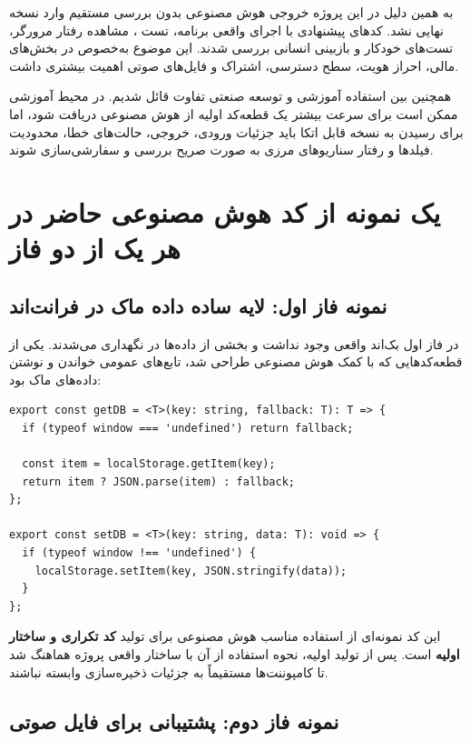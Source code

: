 \documentclass[12pt,a4paper]{article}
\newcommand{\eng}[1]{\lr{#1}}
\begin{document}
به همین دلیل در این پروژه خروجی هوش مصنوعی بدون بررسی مستقیم وارد نسخه نهایی نشد. کدهای پیشنهادی
با اجرای واقعی برنامه، تست \eng{API}، مشاهده رفتار مرورگر، تست‌های خودکار و بازبینی انسانی بررسی شدند.
این موضوع به‌خصوص در بخش‌های مالی، احراز هویت، سطح دسترسی، اشتراک و فایل‌های صوتی اهمیت بیشتری داشت.

همچنین بین استفاده آموزشی و توسعه صنعتی تفاوت قائل شدیم. در محیط آموزشی ممکن است برای سرعت بیشتر
یک قطعه‌کد اولیه از هوش مصنوعی دریافت شود، اما برای رسیدن به نسخه قابل اتکا باید جزئیات ورودی، خروجی،
حالت‌های خطا، محدودیت فیلدها و رفتار سناریوهای مرزی به صورت صریح بررسی و سفارشی‌سازی شوند.

\section{یک نمونه از کد هوش مصنوعی حاضر در هر یک از دو فاز}

\subsection{نمونه فاز اول: لایه ساده داده ماک در فرانت‌اند}

در فاز اول بک‌اند واقعی وجود نداشت و بخشی از داده‌ها در \eng{LocalStorage} نگهداری می‌شدند.
یکی از قطعه‌کدهایی که با کمک هوش مصنوعی طراحی شد، تابع‌های عمومی خواندن و نوشتن داده‌های ماک بود:

\begin{LTR}
\begin{lstlisting}
export const getDB = <T>(key: string, fallback: T): T => {
  if (typeof window === 'undefined') return fallback;

  const item = localStorage.getItem(key);
  return item ? JSON.parse(item) : fallback;
};

export const setDB = <T>(key: string, data: T): void => {
  if (typeof window !== 'undefined') {
    localStorage.setItem(key, JSON.stringify(data));
  }
};
\end{lstlisting}
\end{LTR}

این کد نمونه‌ای از استفاده مناسب هوش مصنوعی برای تولید
\textbf{کد تکراری و ساختار اولیه} است. پس از تولید اولیه، نحوه استفاده از آن با ساختار واقعی پروژه هماهنگ شد
تا کامپوننت‌ها مستقیماً به جزئیات ذخیره‌سازی وابسته نباشند.

\subsection{نمونه فاز دوم: پشتیبانی \eng{HTTP Range} برای فایل صوتی}
\end{document}
